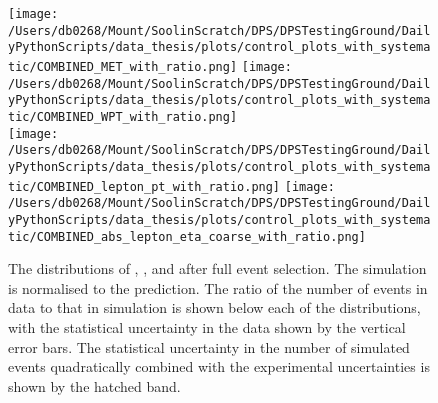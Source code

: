 \begin{figure}[hp]
	\centering
	\texttt{[image: /Users/db0268/Mount/SoolinScratch/DPS/DPSTestingGround/DailyPythonScripts/data\_thesis/plots/control\_plots\_with\_systematic/COMBINED\_MET\_with\_ratio.png]}
	\texttt{[image: /Users/db0268/Mount/SoolinScratch/DPS/DPSTestingGround/DailyPythonScripts/data\_thesis/plots/control\_plots\_with\_systematic/COMBINED\_WPT\_with\_ratio.png]} \\
	\texttt{[image: /Users/db0268/Mount/SoolinScratch/DPS/DPSTestingGround/DailyPythonScripts/data\_thesis/plots/control\_plots\_with\_systematic/COMBINED\_lepton\_pt\_with\_ratio.png]} 
	\texttt{[image: /Users/db0268/Mount/SoolinScratch/DPS/DPSTestingGround/DailyPythonScripts/data\_thesis/plots/control\_plots\_with\_systematic/COMBINED\_abs\_lepton\_eta\_coarse\_with\_ratio.png]}
	\caption[The distributions of \ptmiss, \WPT, \LPT and \LETA after full event selection. The \ttbar{} simulation is normalised to the \NNLO{} prediction. The ratio of the number of events in data to that in simulation is shown below each of the distributions, with the statistical uncertainty in the data shown by the vertical error bars. The statistical uncertainty in the number of simulated events quadratically combined with the experimental uncertainties is shown by the hatched band.]{The distributions of \ptmiss, \WPT, \LPT and \LETA after full event selection. The \ttbar{} simulation is normalised to the \NNLO{} prediction. The ratio of the number of events in data to that in simulation is shown below each of the distributions, with the statistical uncertainty in the data shown by the vertical error bars. The statistical uncertainty in the number of simulated events quadratically combined with the experimental uncertainties is shown by the hatched band.}
	\label{fig:combControlPlot2}
\end{figure}